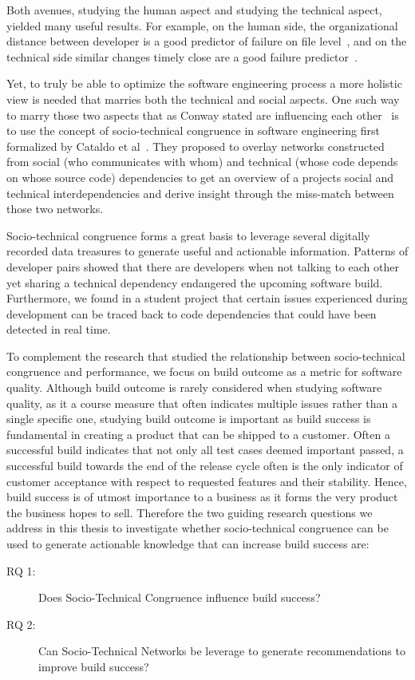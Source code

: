 Both avenues, studying the human aspect and studying the technical aspect, yielded many useful results.
For example, on the human side, the organizational distance between developer is a good predictor of failure on file level~\cite{nagappan:icse:2008}, and on the technical side similar changes timely close are a good failure predictor~\cite{kim:icse:2007}.

Yet, to truly be able to optimize the software engineering process a more holistic view is needed that marries both the technical and social aspects.
One such way to marry those two aspects that as Conway stated are influencing each other~\cite{conway:datamination:1968} is to use the concept of socio-technical congruence in software engineering first formalized by Cataldo et al~\cite{cataldo:cscw:2006}.
They proposed to overlay networks constructed from social (who communicates with whom) and technical (whose code depends on whose source code) dependencies to get an overview of a projects social and technical interdependencies and derive insight through the miss-match between those two networks.



Socio-technical congruence forms a great basis to leverage several digitally recorded data treasures to generate useful and actionable information.
Patterns of developer pairs showed that there are developers when not talking to each other yet sharing a technical dependency endangered the upcoming software build.
Furthermore, we found in a student project that certain issues experienced during development can be traced back to code dependencies that could have been detected in real time.

To complement the research that studied the relationship between socio-technical congruence and performance, we focus on build outcome as a metric for software quality.
Although build outcome is rarely considered when studying software quality, as it a course measure that often indicates multiple issues rather than a single specific one, studying build outcome is important as build success is fundamental in creating a product that can be shipped to a customer.
Often a successful build indicates that not only all test cases deemed important passed, a successful build towards the end of the release cycle often is the only indicator of customer acceptance with respect to requested features and their stability.
Hence, build success is of utmost importance to a business as it forms the very product the business hopes to sell.
Therefore the two guiding research questions we address in this thesis to investigate whether socio-technical congruence can be used to generate actionable knowledge that can increase build success are:
\begin{description}
\item[RQ 1:] Does Socio-Technical Congruence influence build success?
\item[RQ 2:] Can Socio-Technical Networks be leverage to generate recommendations to improve build success?
\end{description}

